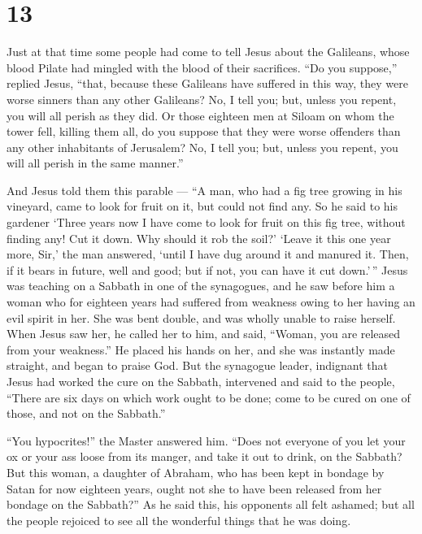 \hypertarget{section-11}{%
\section{13}\label{section-11}}

 Just at that time some people had come to tell Jesus about
the Galileans, whose blood Pilate had mingled with the blood of their
sacrifices.  ``Do you suppose,'' replied Jesus, ``that,
because these Galileans have suffered in this way, they were worse
sinners than any other Galileans?  No, I tell you; but,
unless you repent, you will all perish as they did.  Or
those eighteen men at Siloam on whom the tower fell, killing them all,
do you suppose that they were worse offenders than any other inhabitants
of Jerusalem?  No, I tell you; but, unless you repent, you
will all perish in the same manner.''

 And Jesus told them this parable --- ``A man, who had a fig
tree growing in his vineyard, came to look for fruit on it, but could
not find any.  So he said to his gardener `Three years now I
have come to look for fruit on this fig tree, without finding any! Cut
it down. Why should it rob the soil?'  `Leave it this one
year more, Sir,' the man answered, `until I have dug around it and
manured it.  Then, if it bears in future, well and good; but
if not, you can have it cut down.'\,''  Jesus was teaching
on a Sabbath in one of the synagogues,  and he saw before
him a woman who for eighteen years had suffered from weakness owing to
her having an evil spirit in her. She was bent double, and was wholly
unable to raise herself.  When Jesus saw her, he called her
to him, and said, ``Woman, you are released from your weakness.''
 He placed his hands on her, and she was instantly made
straight, and began to praise God.  But the synagogue
leader, indignant that Jesus had worked the cure on the Sabbath,
intervened and said to the people, ``There are six days on which work
ought to be done; come to be cured on one of those, and not on the
Sabbath.''

 ``You hypocrites!'' the Master answered him. ``Does not
everyone of you let your ox or your ass loose from its manger, and take
it out to drink, on the Sabbath?  But this woman, a
daughter of Abraham, who has been kept in bondage by Satan for now
eighteen years, ought not she to have been released from her bondage on
the Sabbath?''  As he said this, his opponents all felt
ashamed; but all the people rejoiced to see all the wonderful things
that he was doing.


